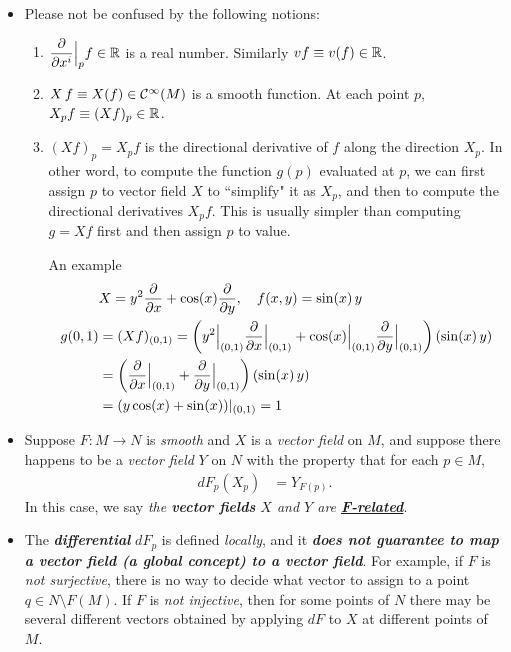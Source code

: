\documentclass[11pt]{article}
\begin{document}
\begin{itemize}
\item \begin{remark}
Please not be confused by the following notions:
\begin{enumerate}
\item $\dfrac{\partial}{\partial x^i}\Bigr|_{p}f \in {\mathbb R}$ is a real number. Similarly $vf \equiv v(f) \in {\mathbb R}$.
\item $X\,f \equiv X(f) \in {\mathcal C}^{\infty}(M)$ is a smooth function. At each point $p$, $X_pf \equiv (Xf)_p \in {\mathbb R}$.
\item $(Xf)_p = X_pf$  is the directional derivative of $f$ along the direction $X_p$. In other word, to compute the function $g(p)$ evaluated at $p$, we can first assign $p$ to vector field $X$ to ``simplify" it as $X_p$, and then to compute the directional derivatives $X_pf$. This is usually simpler than computing $g = Xf$ first and then assign $p$ to value.

An example 
\begin{align*}
&X = y^2\frac{\partial }{ \partial x} + \cos(x) \frac{\partial }{ \partial y}, \quad f(x,y) = \sin(x)\,y \\
g(0,1)&= (Xf)_{(0,1)} = \left(y^2\Bigr|_{(0,1)}\frac{\partial }{ \partial x}\Bigr|_{(0,1)} + \cos(x)\Bigr|_{(0,1)} \frac{\partial }{ \partial y}\Bigr|_{(0,1)}\right)(\sin(x)\,y)\\
&=\left(\frac{\partial }{ \partial x}\Bigr|_{(0,1)} + \frac{\partial }{ \partial y}\Bigr|_{(0,1)}\right)(\sin(x)\,y)\\
&= (y\cos(x) + \sin(x))|_{(0,1)} = 1
\end{align*}
\end{enumerate}
\end{remark}

\item 
\begin{definition}
Suppose $F: M \rightarrow N$ is \emph{smooth} and $X$ is a \emph{vector field} on $M$,  and suppose there happens to be a \emph{vector field} $Y$ on $N$ with the property that for each $p \in M$,
\begin{align*}
dF_{p}(X_p) &= Y_{F(p)}.
\end{align*}
 In this case, we say \emph{the \textbf{vector fields} $X$ and $Y$ are \underline{\textbf{F-related}}}. 
\end{definition}

\item \begin{remark}
The \emph{\textbf{differential}} $dF_{p}$ is defined \emph{locally}, and it \emph{\textbf{does not guarantee to map a vector field (a global concept) to a vector field}}.  For example,
if $F$ is \emph{not surjective}, there is no way to decide what vector to assign to a point $q \in N \setminus F(M)$.  If $F$ is \emph{not injective}, then for some points of $N$ there may be several different vectors obtained by applying $dF$ to $X$ at different points of $M$.
\end{remark}
\end{itemize}
\end{document}
